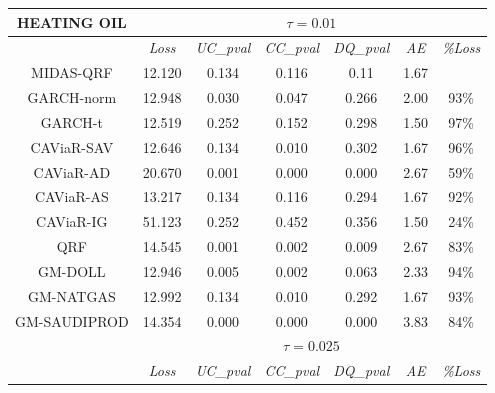 \begin{table}[H]
\renewcommand{\arraystretch}{0.72}
\centering
\begin{tabular}{ccccccc}
\hline
\textbf{HEATING OIL}                   & \multicolumn{6}{c}{$\tau=0.01$}                         \\ \hline
                                                        & \textit{Loss}   & \textit{UC\_pval} & \textit{CC\_pval} & \textit{DQ\_pval }& \textit{AE }  & \textit{\%Loss}\\ \hline
\rowcolor[HTML]{D9D9D9} MIDAS-QRF  & 12.120 & 0.134    & 0.116    & 0.11     & 1.67 &        \\
\rowcolor[HTML]{D9D9D9}GARCH-norm                                              & 12.948 & 0.030    & 0.047    & 0.266    & 2.00 & 93\%   \\
\rowcolor[HTML]{D9D9D9} GARCH-t    & 12.519 & 0.252    & 0.152    & 0.298    & 1.50 & 97\%   \\
\rowcolor[HTML]{D9D9D9}CAViaR-SAV                                              & 12.646 & 0.134    & 0.010    & 0.302    & 1.67 & 96\%   \\
CAViaR-AD                                               & 20.670 & 0.001    & 0.000    & 0.000    & 2.67 & 59\%   \\
\rowcolor[HTML]{D9D9D9} CAViaR-AS  & 13.217 & 0.134    & 0.116    & 0.294    & 1.67 & 92\%   \\
\rowcolor[HTML]{D9D9D9} CAViaR-IG  & 51.123 & 0.252    & 0.452    & 0.356    & 1.50 & 24\%   \\
QRF                                                     & 14.545 & 0.001    & 0.002    & 0.009    & 2.67 & 83\%   \\
GM-DOLL                                                 & 12.946 & 0.005    & 0.002    & 0.063    & 2.33 & 94\%   \\
\rowcolor[HTML]{D9D9D9}GM-NATGAS                                               & 12.992 & 0.134    & 0.010    & 0.292    & 1.67 & 93\%   \\
GM-SAUDIPROD                                            & 14.354 & 0.000    & 0.000    & 0.000    & 3.83 & 84\%   \\ \hline
                                                        & \multicolumn{6}{c}{$\tau=0.025$}                        \\ \hline
                                                        & \textit{Loss}   & \textit{UC\_pval} & \textit{CC\_pval} & \textit{DQ\_pval }& \textit{AE }  & \textit{\%Loss}\\

\end{tabular}
\end{table}
